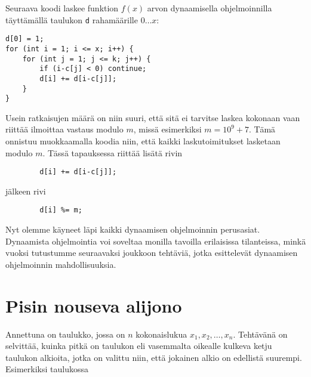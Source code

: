 Seuraava koodi laskee funktion $f(x)$ arvon
dynaamisella ohjelmoinnilla täyttämällä taulukon
\texttt{d} rahamäärille $0 \ldots x$:

\begin{lstlisting}
d[0] = 1;
for (int i = 1; i <= x; i++) {
    for (int j = 1; j <= k; j++) {
        if (i-c[j] < 0) continue;
        d[i] += d[i-c[j]];
    }
}
\end{lstlisting}

Usein ratkaisujen määrä on niin suuri, että sitä ei tarvitse
laskea kokonaan vaan riittää ilmoittaa vastaus
modulo $m$, missä esimerkiksi $m=10^9+7$.
Tämä onnistuu muokkaamalla koodia niin,
että kaikki laskutoimitukset lasketaan modulo $m$.
Tässä tapauksessa riittää lisätä rivin
\begin{lstlisting}
        d[i] += d[i-c[j]];
\end{lstlisting}
jälkeen rivi
\begin{lstlisting}
        d[i] %= m;
\end{lstlisting}

Nyt olemme käyneet läpi kaikki dynaamisen
ohjelmoinnin perusasiat.
Dynaamista ohjelmointia voi soveltaa monilla
tavoilla erilaisissa tilanteissa,
minkä vuoksi tutustumme seuraavaksi
joukkoon tehtäviä, jotka esittelevät
dynaamisen ohjelmoinnin mahdollisuuksia.

\section{Pisin nouseva alijono}


Annettuna on taulukko, jossa on $n$
kokonaislukua $x_1,x_2,\ldots,x_n$.
Tehtävänä on selvittää,
kuinka pitkä on taulukon
eli vasemmalta oikealle kulkeva
ketju taulukon alkioita,
jotka on valittu niin,
että jokainen alkio on edellistä suurempi.
Esimerkiksi taulukossa


